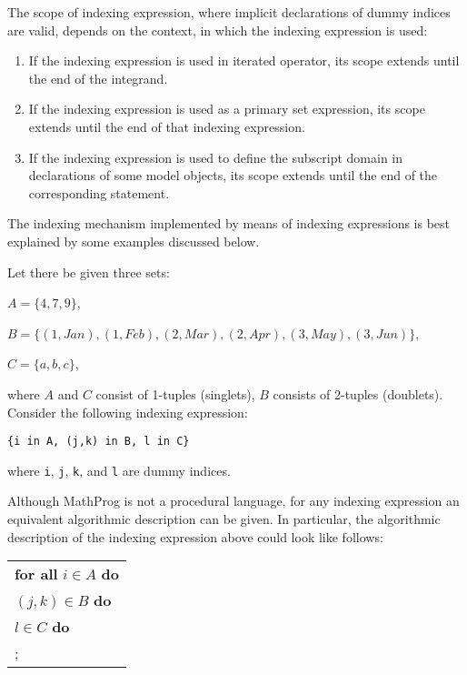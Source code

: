 \documentclass[10pt]{article}
\begin{document}
The scope of indexing expression, where implicit declarations of dummy
indices are valid, depends on the context, in which the indexing
expression is used:

\begin{enumerate}
\item If the indexing expression is used in iterated operator, its
scope extends until the end of the integrand.
\item If the indexing expression is used as a primary set expression,
its scope extends until the end of that indexing expression.
\item If the indexing expression is used to define the subscript domain
in declarations of some model objects, its scope extends until the end
of the corresponding statement.
\end{enumerate}

The indexing mechanism implemented by means of indexing expressions is
best explained by some examples discussed below.

Let there be given three sets:

\medskip

\noindent\hspace{33.5pt}
$A=\{4,7,9\}$,

\medskip

\noindent\hfil
$B=\{(1,Jan),(1,Feb),(2,Mar),(2,Apr),(3,May),(3,Jun)\}$,

\medskip

\noindent\hspace{33.5pt}
$C=\{a,b,c\}$,

\medskip

\noindent where $A$ and $C$ consist of 1-tuples (singlets), $B$
consists of 2-tuples (doublets). Consider the following indexing
expression:

\medskip

\noindent\hfil
{\tt\{i in A, (j,k) in B, l in C\}}

\medskip

\noindent where {\tt i}, {\tt j}, {\tt k}, and {\tt l} are dummy
indices.

Although MathProg is not a procedural language, for any indexing
expression an equivalent algorithmic description can be given. In
particular, the algorithmic description of the indexing expression
above could look like follows:

\medskip

\noindent\hfil
\begin{tabular}{@{}l@{}}
{\bf for all} $i\in A$ {\bf do}\\
\hspace{12pt}{\bf for all} $(j,k)\in B$ {\bf do}\\
\hspace{24pt}{\bf for all} $l\in C$ {\bf do}\\
\hspace{36pt}{\it action};\\
\end{tabular}
\end{document}
